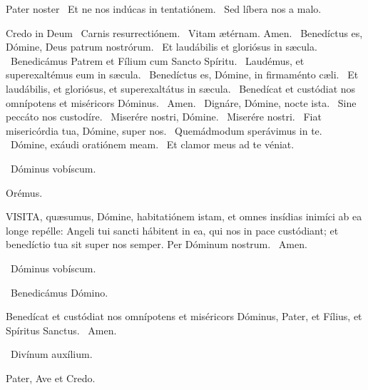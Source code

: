 Pater noster  \V\ Et ne nos indúcas in tentatiónem. \R\ Sed líbera nos a malo.

Credo in Deum  \V\ Carnis resurrectiónem. \R\ Vitam ætérnam. Amen. \V\ Benedíctus es, Dómine, Deus patrum nostrórum. \R\ Et laudábilis et gloriósus in sæcula. \V\ Benedicámus Patrem et Fílium cum Sancto Spíritu. \R\ Laudémus, et superexaltémus eum in sæcula. \V\ Benedíctus es, Dómine, in firmaménto cæli. \R\ Et laudábilis, et gloriósus, et superexaltátus in sæcula. \V\ Benedícat et custódiat nos omnípotens et miséricors Dóminus. \R\ Amen. \V\ Dignáre, Dómine, nocte ista. \R\ Sine peccáto nos custodíre. \V\ Miserére nostri, Dómine. \R\ Miserére nostri. \V\ Fiat misericórdia tua, Dómine, super nos. \R\ Quemádmodum sperávimus in te. \V\ Dómine, exáudi oratiónem meam. \R\ Et clamor meus ad te véniat.

\V\ Dóminus vobíscum.

Orémus. 

\lettrine[lines=2]{V}{ISITA}, quæsumus, Dómine, habitatiónem istam, et omnes insídias inimíci ab ea longe repélle: Angeli tui sancti hábitent in ea, qui nos in pace custódiant; et benedíctio tua sit super nos semper. Per Dóminum nostrum. \R\ Amen.

\V\ Dóminus vobíscum.

\V\ Benedicámus Dómino.

 Benedícat et custódiat nos omnípotens et miséricors Dóminus, Pater, et Fílius, et Spíritus Sanctus. \R\ Amen.


\V\ Divínum auxílium.

Pater, Ave et Credo.

